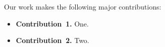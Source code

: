 Our work makes the following major contributions:
\begin{itemize}
  \item {\bfseries Contribution~1.} One.
  \item {\bfseries Contribution~2.} Two.
\end{itemize}
